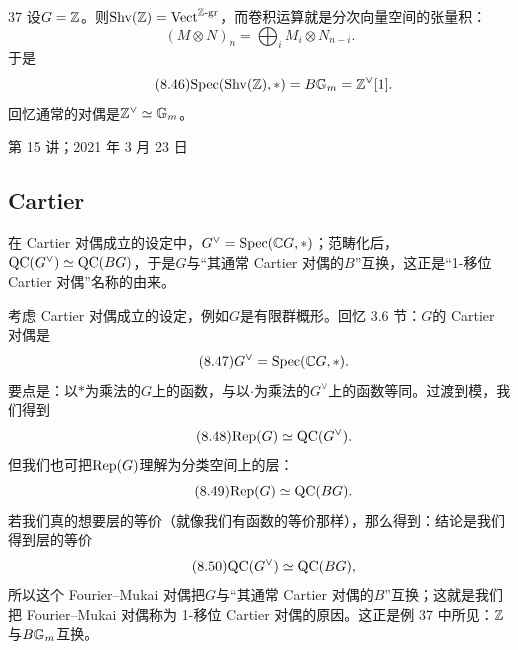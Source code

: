 \begin{srcex}{37}
设$G=\mathbb{Z}$。则$\mathrm{Shv}(\mathbb{Z})=\mathrm{Vect}^{\mathbb{Z}\text{-}\mathrm{gr}}$，而卷积运算就是分次向量空间的张量积：
\begin{equation}\tag{8.45}
(M\otimes N)_n=\bigoplus_i M_i\otimes N_{n-i}.
\end{equation}
于是
\begin{equation}\tag{8.46}
\mathrm{Spec}(\mathrm{Shv}(\mathbb{Z}),*)=B\mathbb{G}_m=\mathbb{Z}^{\vee}[1].
\end{equation}
回忆通常的对偶是$\mathbb{Z}^{\vee}\simeq\mathbb{G}_m$。
\end{srcex}

\begin{flushright}\small 第 15 讲；2021 年 3 月 23 日\end{flushright}

\subsection{Cartier}
\begin{sectionkey}
在 Cartier 对偶成立的设定中，$G^{\vee}=\mathrm{Spec}(\mathbb{C} G,*)$；范畴化后，$\mathrm{QC}(G^{\vee})\simeq\mathrm{QC}(BG)$，于是$G$与“其通常 Cartier 对偶的$B$”互换，这正是“1-移位 Cartier 对偶”名称的由来。
\end{sectionkey}

考虑 Cartier 对偶成立的设定，例如$G$是有限群概形。回忆 3.6 节：$G$的 Cartier 对偶是
\begin{equation}\tag{8.47}
G^{\vee}=\mathrm{Spec}(\mathbb{C} G,*).
\end{equation}
要点是：以$*$为乘法的$G$上的函数，与以$\cdot$为乘法的$G^{\vee}$上的函数等同。过渡到模，我们得到
\begin{equation}\tag{8.48}
\mathrm{Rep}(G)\simeq\mathrm{QC}(G^{\vee}).
\end{equation}
但我们也可把$\mathrm{Rep}(G)$理解为分类空间上的层：
\begin{equation}\tag{8.49}
\mathrm{Rep}(G)\simeq\mathrm{QC}(BG).
\end{equation}
若我们真的想要层的等价（就像我们有函数的等价那样），那么得到：结论是我们得到层的等价
\begin{equation}\tag{8.50}
\mathrm{QC}(G^{\vee})\simeq\mathrm{QC}(BG),
\end{equation}
所以这个 Fourier--Mukai 对偶把$G$与“其通常 Cartier 对偶的$B$”互换；这就是我们把 Fourier--Mukai 对偶称为 1-移位 Cartier 对偶的原因。这正是例 37 中所见：$\mathbb{Z}$与$B\mathbb{G}_m$互换。

